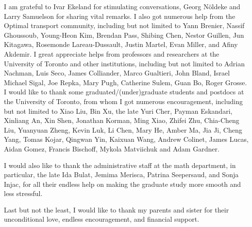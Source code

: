 \documentclass{ut-thesis}[10pt]
\theoremstyle{plain}
\theoremstyle{definition}
\theoremstyle{remark}
\numberwithin{equation}{section}
\begin{document}
\begin{preliminary}
\begin{acknowledgements}
I am grateful to Ivar Ekeland for stimulating conversations, Georg N\" oldeke and Larry Samuelson for sharing vital remarks.
I also got numerous help from the Optimal transport community, including but not limited to Yann Brenier, Nassif Ghoussoub, Young-Heon Kim, Brendan Pass,  Shibing Chen, Nestor Guillen, Jun Kitagawa, Rosemonde Lareau-Dussault, Justin Martel, Evan Miller, and Afiny Akdemir. I great appreciate helps from professors and researchers at the University of Toronto and other institutions, including but not limited to Adrian Nachman, Luis Seco, James Colliander, Marco Gualtieri, John Bland, Israel Michael Sigal, Joe Repka, Mary Pugh, Catherine Sulem, Guan Bo, Roger Grosse.
I would like to thank some graduated/(under)graduate students and postdocs at the University of Toronto, from whom I got numerous encouragement, including but not limited to Xiao Liu, Bin Xu, the late Yuri Cher, Payman Eskandari, Xinliang An, Xin Shen, Jonathan Korman, Ming Xiao, Zhifei Zhu, Chia-Cheng Liu, Yuanyuan Zheng, Kevin Luk, Li Chen, Mary He, Amber Ma, Jia Ji, Cheng Yang, Tomas Kojar, Qingwan Yin, Kaixuan Wang, Andrew Colinet, James Lucas, Aidan Gomez, Francis Bischoff, Mykola Matviichuk and Adam Gardner.
 


I would also like to thank the administrative staff at the math department, in particular, the late Ida Bulat, Jemima Merisca, Patrina Seepersaud, and Sonja Injac, for all their endless help on making the graduate study more smooth and less stressful.  

Last but not the least, I would like to thank my parents and sister for their unconditional love, endless encouragement, and financial support.


\end{acknowledgements}

\tableofcontents




\end{preliminary}
\end{document}
